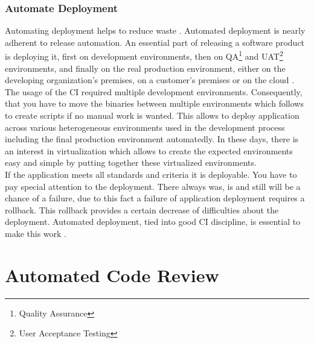 \subsection{Automate Deployment}

Automating deployment helps to reduce waste \cite{CollabNet}. Automated deployment is nearly adherent to release automation. An essential part of releasing a software product is deploying it, first on development environments, then on QA\footnote{Quality Assurance} and UAT\footnote{User Acceptance Testing} environments, and finally on the real production environment, either on the developing organization's premises, on a customer's premises or on the cloud \cite{deployment_automation}. The usage of the CI required multiple development environments. Consequently, that you have to move the binaries between multiple environments which follows to create scripts if no manual work is wanted. This allows to deploy application across various heterogeneous environments used in the development process including the final production environment automatedly. In these days, there is an interest in virtualization which allows to create the expected environments easy and simple by putting together these virtualized environments.\\

If the application meets all standards and criteria it is deployable. You have to pay special attention to the deployment. There always was, is and still will be a chance of a failure, due to this fact a failure of application deployment requires a rollback. This rollback provides a certain decrease of difficulties about the deployment. Automated deployment, tied into good CI discipline, is essential to make this work \cite{MartinFowler}.

\chapter{Automated Code Review}

